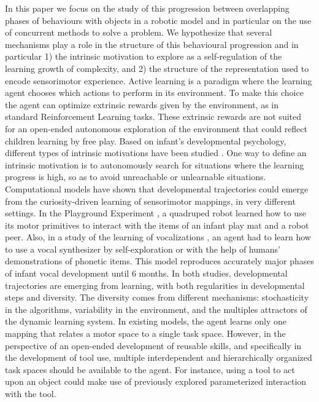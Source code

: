 \documentclass[10pt,letterpaper]{article}
\begin{document}
	In this paper we focus on the study of this progression between overlapping phases of behaviours with objects in a robotic model and in particular on the use of concurrent methods to solve a problem.	
	We hypothesize that several mechanisms play a role in the structure of this behavioural progression and in particular 
	1) the intrinsic motivation to explore as a self-regulation of the learning growth of complexity, and 
	2) the structure of the representation used to encode sensorimotor experience.	
	Active learning is a paradigm where the learning agent chooses which actions to perform in its environment.
	To make this choice the agent can optimize extrinsic rewards given by the environment, as in standard Reinforcement Learning tasks.
	These extrinsic rewards are not suited for an open-ended autonomous exploration of the environment that could reflect children learning by free play.
	Based on infant's developmental psychology, different types of intrinsic motivations have been studied \cite{santucci2013}.
	One way to define an intrinsic motivation is to autonomously search for situations where the learning progress is high, so as to avoid unreachable or unlearnable situations.
	Computational models have shown that developmental trajectories could emerge from the curiosity-driven learning of sensorimotor mappings, in very different settings.
	In the Playground Experiment \cite{oudeyer_what_2007}, a quadruped robot learned how to use its motor primitives to interact with the items of an infant play mat and a robot peer.
	Also, in a study of the learning of vocalizations \cite{moulin-frier_self-organization_2014}, an agent had to learn how to
	use a vocal synthesizer by self-exploration or with the help of humans' demonstrations of phonetic items. 
	This model reproduces accurately major phases of infant vocal development until $6$ months.
	In both studies, developmental trajectories are emerging from learning, with both regularities in developmental steps and diversity.
	The diversity comes from different mechanisms: stochasticity in the algorithms, variability in the environment, and the multiples attractors of the dynamic learning system.
	In existing models, the agent learns only one mapping that relates a motor space to a single task space. 
	However, in the perspective of an open-ended development of reusable skills, and specifically in the development of tool use, multiple interdependent and hierarchically organized task spaces should be available to the agent.
	For instance, using a tool to act upon an object could make use of previously explored parameterized interaction with the tool.
	
\end{document}
